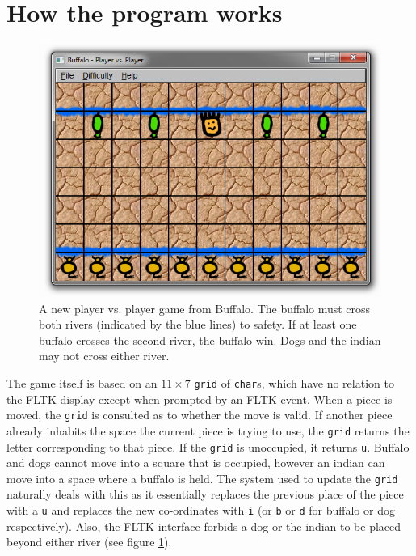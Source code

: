 \documentclass{UoBnote}
\begin{document}
\section{How the program works}
\begin{figure}[htb]
	\begin{center}
		\includegraphics[height=0.4\textheight]{figure1.png}
	\end{center}
	\caption{A new player vs. player game from Buffalo. The buffalo must cross both rivers (indicated by the blue lines) to safety. If at least one buffalo crosses the second river, the buffalo win. Dogs and the indian may not cross either river.}
	\label{1}
\end{figure}
The game itself is based on an $11\times7$ \verb=grid= of \verb=char=s, which have no relation to the FLTK display except when prompted by an FLTK event. When a piece is moved, the \verb=grid= is consulted as to whether the move is valid. If another piece already inhabits the space the current piece is trying to use, the \verb=grid= returns the letter corresponding to that piece. If the \verb=grid= is unoccupied, it returns \verb=u=. Buffalo and dogs cannot move into a square that is occupied, however an indian can move into a space where a buffalo is held. The system used to update the \verb=grid= naturally deals with this as it essentially replaces the previous place of the piece with a \verb=u= and replaces the new co-ordinates with \verb=i= (or \verb=b= or \verb=d= for buffalo or dog respectively). Also, the FLTK interface forbids a dog or the indian to be placed beyond either river (see figure \ref{1}).
\end{document}
